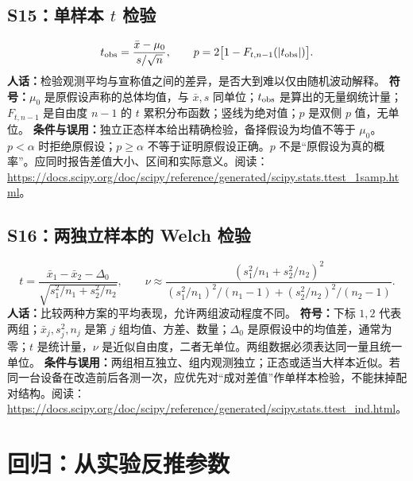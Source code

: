 \subsection{S15：单样本 $t$ 检验}
\begin{equation}
 t_{\rm obs}=\frac{\bar{x}-\mu_0}{s/\sqrt n},\qquad
 p=2\bigl[1-F_{t,n-1}(|t_{\rm obs}|)\bigr].
\end{equation}
\textbf{人话：}检验观测平均与宣称值之间的差异，是否大到难以仅由随机波动解释。
\textbf{符号：}$\mu_0$ 是原假设声称的总体均值，与 $\bar x,s$ 同单位；$t_{\rm obs}$ 是算出的无量纲统计量；$F_{t,n-1}$ 是自由度 $n-1$ 的 $t$ 累积分布函数；竖线为绝对值；$p$ 是双侧 $p$ 值，无单位。
\textbf{条件与误用：}独立正态样本给出精确检验，备择假设为均值不等于 $\mu_0$。$p<\alpha$ 时拒绝原假设；$p\ge\alpha$ 不等于证明原假设正确。$p$ 不是“原假设为真的概率”。应同时报告差值大小、区间和实际意义。阅读：\url{https://docs.scipy.org/doc/scipy/reference/generated/scipy.stats.ttest_1samp.html}。

\subsection{S16：两独立样本的 Welch 检验}
\begin{equation}
 t=\frac{\bar{x}_1-\bar{x}_2-\Delta_0}{\sqrt{s_1^2/n_1+s_2^2/n_2}},\qquad
 \nu\approx\frac{(s_1^2/n_1+s_2^2/n_2)^2}{(s_1^2/n_1)^2/(n_1-1)+(s_2^2/n_2)^2/(n_2-1)}.
\end{equation}
\textbf{人话：}比较两种方案的平均表现，允许两组波动程度不同。
\textbf{符号：}下标 $1,2$ 代表两组；$\bar{x}_j,s_j^2,n_j$ 是第 $j$ 组均值、方差、数量；$\Delta_0$ 是原假设中的均值差，通常为零；$t$ 是统计量，$\nu$ 是近似自由度，二者无单位。两组数据必须表达同一量且统一单位。
\textbf{条件与误用：}两组相互独立、组内观测独立；正态或适当大样本近似。若同一台设备在改造前后各测一次，应优先对“成对差值”作单样本检验，不能抹掉配对结构。阅读：\url{https://docs.scipy.org/doc/scipy/reference/generated/scipy.stats.ttest_ind.html}。

\section{回归：从实验反推参数}
